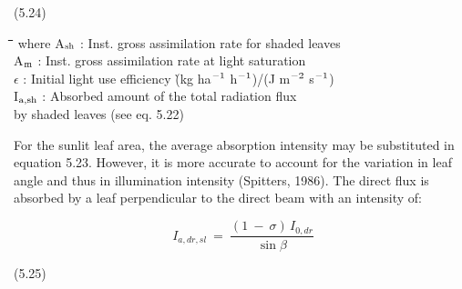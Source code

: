 \documentclass[11pt]{article}
\begin{document}
 \bigskip
\strut\hfill (5.24)

\nwln
\begin{tabbing}
\hspace{1.27cm}\=\hspace{1.27cm}\=\hspace{1.27cm}\=\hspace{1.27cm}\=%
\hspace{1.27cm}\=\hspace{1.27cm}\=\hspace{1.27cm}\=\hspace{1.27cm}\=%
\hspace{1.27cm}\=\hspace{1.27cm}\=\kill
where\> A$_{{\rm sh}}$\> : Inst. gross assimilation rate for shaded leaves\> \> \> \> \> \> \> \> [kg ha$^{{\rm -1}}$ h$^{{\rm -1}}$]\\
\>A$_{{\rm m}}$\> : Inst. gross assimilation rate at light saturation\> \> \> \> \> \> \> \> [kg ha$^{{\rm -1}}$ h$^{{\rm -1}}$]\\
\>$\epsilon$\> : Initial light use efficiency\> \> \> \> \> \> \`(kg ha$^{{\rm -1}}$ h$^{{\rm -1}}$)/(J m$^{{\rm -2}}$ s$^{{\rm -1}}$)\\
\>I$_{{\rm a,sh}}$\> : Absorbed amount of the total radiation flux \\
\>\>   by shaded leaves (see eq. 5.22)\> \> \> \> \> \> \> \> [J m$^{{\rm -2}}$ s$^{{\rm -1}}$]
\end{tabbing}

\bigskip
\bigskip
\bigskip
\bigskip
\bigskip
\bigskip
\bigskip
\bigskip
For the sunlit leaf area, the average absorption intensity may be substituted in equation
5.23. However, it is more accurate to account for the variation in leaf angle and thus in
illumination intensity (Spitters, 1986). The direct flux is absorbed by a leaf perpendicular
to the direct beam with an intensity of: 

\begin{displaymath}
I _{a,dr,sl} ~=~{\frac{(1~-~ \sigma )\, I _{0,dr} }{\sin \beta }}
\end{displaymath}

 \bigskip
\strut\hfill (5.25)
\end{document}
